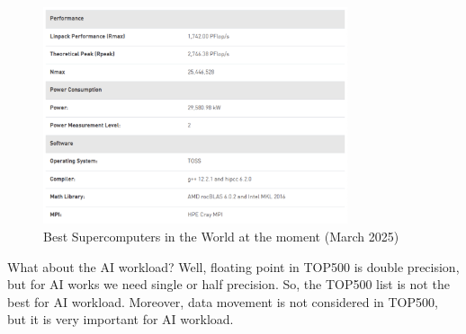 \begin{figure}
    \centering
    \includegraphics[width=0.8\textwidth]{assets/fig12.png}
    \caption{Best Supercomputers in the World at the moment (March 2025)}
    \label{fig:top500}
\end{figure}

What about the AI workload? Well, floating point in TOP500 is double precision, but for AI works we need single or half precision. So, the TOP500 list is not the best for AI workload. Moreover, data movement is not considered in TOP500, but it is very important for AI workload.
